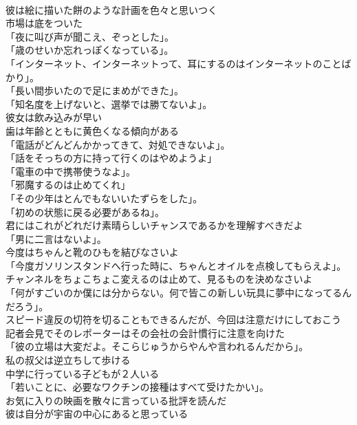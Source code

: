 \documentclass[8pt]{extreport}
\begin{document}
\begin{CJK}{UTF8}{min}
\\	彼は絵に描いた餅のような計画を色々と思いつく	
\\	市場は底をついた	
\\	「夜に叫び声が聞こえ、ぞっとした」。	
\\	「歳のせいか忘れっぽくなっている」。	
\\	「インターネット、インターネットって、耳にするのはインターネットのことばかり」。	
\\	「長い間歩いたので足にまめができた」。	
\\	「知名度を上げないと、選挙では勝てないよ」。	
\\	彼女は飲み込みが早い	
\\	歯は年齢とともに黄色くなる傾向がある	
\\	「電話がどんどんかかってきて、対処できないよ」。	
\\	「話をそっちの方に持って行くのはやめようよ」	
\\	「電車の中で携帯使うなよ」。	
\\	「邪魔するのは止めてくれ」	
\\	「その少年はとんでもないいたずらをした」。	
\\	「初めの状態に戻る必要があるね」。	
\\	君にはこれがどれだけ素晴らしいチャンスであるかを理解すべきだよ	
\\	「男に二言はないよ」。	
\\	今度はちゃんと靴のひもを結びなさいよ	
\\	「今度ガソリンスタンドへ行った時に、ちゃんとオイルを点検してもらえよ」。	
\\	チャンネルをちょこちょこ変えるのは止めて、見るものを決めなさいよ	
\\	「何がすごいのか僕には分からない。何で皆この新しい玩具に夢中になってるんだろう」。	
\\	スピード違反の切符を切ることもできるんだが、今回は注意だけにしておこう	
\\	記者会見でそのレポーターはその会社の会計慣行に注意を向けた	
\\	「彼の立場は大変だよ。そこらじゅうからやんや言われるんだから」。	
\\	私の叔父は逆立ちして歩ける	
\\	中学に行っている子どもが２人いる	
\\	「若いことに、必要なワクチンの接種はすべて受けたかい」。	
\\	お気に入りの映画を散々に言っている批評を読んだ	
\\	彼は自分が宇宙の中心にあると思っている	

\end{CJK}
\end{document}
